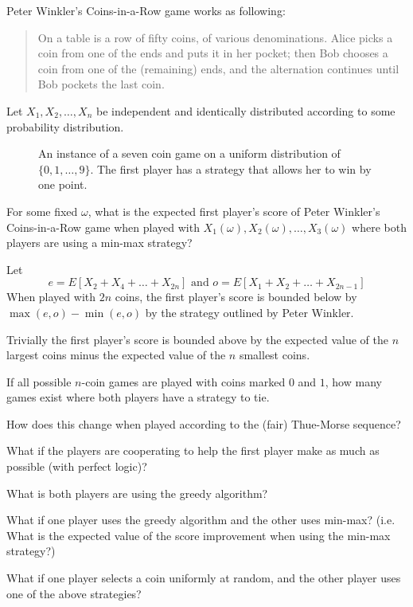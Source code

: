 \documentclass{article}
\begin{document}
Peter Winkler's Coins-in-a-Row game works as following:
\begin{quote}
  On a table is a row of fifty coins, of various denominations.
  Alice picks a coin from one of the ends and puts it in her pocket;
  then Bob chooses a coin from one of the (remaining) ends,
  and the alternation continues until Bob pockets the last coin.
\end{quote}

Let $X_1, X_2, \hdots, X_n$ be independent and identically distributed
according to some probability distribution.
\begin{figure}[!h]
  \centering
  \caption{
    An instance of a seven coin game on a uniform distribution of
    $\{ 0, 1, \hdots, 9\}$. The first player has a strategy that allows her to
    win by one point.
  }
\end{figure}

\begin{question}
  For some fixed $\omega$, what is
  the expected first player's score of Peter Winkler's Coins-in-a-Row game when
  played with $X_1(\omega), X_2(\omega), \hdots, X_3(\omega)$ where both players
  are using a min-max strategy?
\end{question}

\begin{note}
  Let \[
    e = E[X_2 + X_4 + \hdots + X_{2n}] \text{ and }
    o = E[X_1 + X_2 + \hdots + X_{2n - 1}]
  \]
  When played with $2n$ coins, the first player's score is bounded below by $
    \max(e, o) - \min(e, o)
  $ by the strategy outlined by Peter Winkler.

  Trivially the first player's score is bounded above by the expected value of
  the $n$ largest coins minus the expected value of the $n$ smallest coins.
\end{note}

\begin{related}
  \item If all possible $n$-coin games are played with coins marked $0$ and $1$,
    how many games exist where both players have a strategy to tie.
  \item How does this change when played according to the (fair) Thue-Morse sequence?
  \item What if the players are cooperating to help the first player make as
    much as possible (with perfect logic)?
  \item What is both players are using the greedy algorithm?
  \item What if one player uses the greedy algorithm and the other uses min-max?
    (i.e. What is the expected value of the score improvement when using the
    min-max strategy?)
  \item What if one player selects a coin uniformly at random, and the other
    player uses one of the above strategies?
\end{related}
\end{document}

